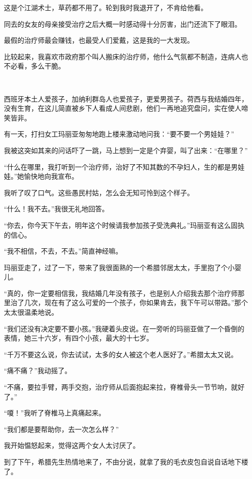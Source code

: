 \par 这是个江湖术士，草药都不用了。轮到我时我退开了，不肯给他看。
\par 同去的女友的母亲接受治疗之后大概一时感动得十分厉害，出门还流下了眼泪。
\par 最假的治疗师最会赚钱，也最受人们爱戴，这是我的一大发现。
\par 比较起来，我喜欢市政府那个叫人搬床的治疗师，他什么气氛都不制造，连病人也不必看，多么干脆。
\par  
\par 西班牙本土人爱孩子，加纳利群岛人也爱孩子，更爱男孩子。荷西与我结婚四年，没有生育，在这儿简直被乡下人看成人间悲剧，他们一再地追究盘问，实在使人啼笑皆非。
\par 有一天，打扫女工玛丽亚匆匆地跑上楼来激动地问我：“要不要一个男娃娃？”
\par 我被这突如其来的问话吓了一跳，马上想到一定是个弃婴，叫了出来：“在哪里？”
\par “什么在哪里，我打听到一个治疗师，治好了不知其数的不孕妇人，生的都是男娃娃。”她愉快地向我宣布。
\par 我听了叹了口气。这些愚民村姑，怎么会无知可怜到这个样子。
\par “什么！我不去。”我很无礼地回答。
\par “你去，你今天下午去，明年这个时候请我参加孩子受洗典礼。”玛丽亚有这么固执的信心。
\par “我不相信，不去，不去。”简直神经嘛。
\par 玛丽亚走了，过了一下，带来了我很面熟的一个希腊邻居太太，手里抱了个小婴儿。
\par “真的，你一定要相信我，我结婚几年没有孩子，也是别人介绍我去那个治疗师那里治了几次，现在有了这么可爱的一个孩子，你如果肯去，我下午可以带路。”那个太太很温柔地说。
\par “我们还没有决定要不要小孩。”我硬着头皮说。在一旁听的玛丽亚做了一个昏倒的表情，她三十六岁，有四个小孩，最大的十七岁。
\par “千万不要这么说，你去试试，太多的女人被这个老人医好了。”希腊太太又说。
\par “痛不痛？”我动摇了。
\par “不痛，要拉手臂，两手交抱，治疗师从后面抱起来拉，脊椎骨头一节节响，就好了。”
\par “嗄！”我听了脊椎马上真痛起来。
\par “我们都是要帮助你，去一次怎么样？”
\par 我开始愠怒起来，觉得这两个女人太讨厌了。
\par 到了下午，希腊先生热情地来了，不由分说，就拿了我的毛衣皮包自说自话地下楼了。
